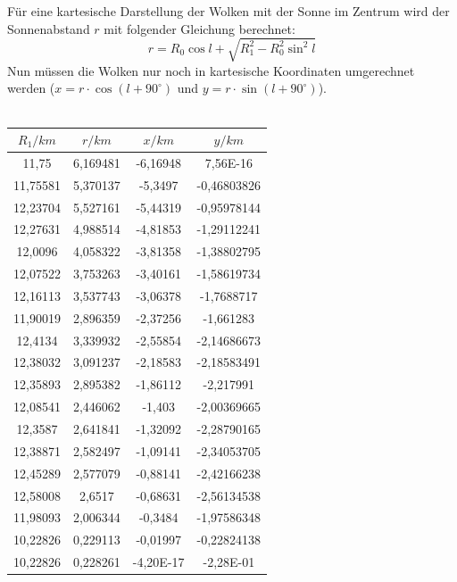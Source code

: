 \documentclass[12pt]{article}
\begin{document}
Für eine kartesische Darstellung der Wolken mit der Sonne im Zentrum wird der Sonnenabstand $r$ mit folgender Gleichung berechnet:
\[r = R_0 \cos l + \sqrt{R^2_1 - R^2_0 \sin^2 l}\]
Nun müssen die Wolken nur noch in kartesische Koordinaten umgerechnet werden ($x = r \cdot \cos (l + 90^\circ)$ und $y= r\cdot \sin ( l + 90^\circ)$).\\\\
\begin{minipage}{.5\textwidth}
        \hspace*{-0.2cm}\begin{tabular}{c|c|c|c|}
            $R_1 / km$ & $r / km$ & $x /km$ & $y / km$ \\ \hline
            11,75 & 6,169481 & -6,16948 & 7,56E-16 \\ 
            11,75581 & 5,370137 & -5,3497 & -0,46803826 \\ 
            12,23704 & 5,527161 & -5,44319 & -0,95978144 \\ 
            12,27631 & 4,988514 & -4,81853 & -1,29112241 \\ 
            12,0096 & 4,058322 & -3,81358 & -1,38802795 \\ 
            12,07522 & 3,753263 & -3,40161 & -1,58619734 \\ 
            12,16113 & 3,537743 & -3,06378 & -1,7688717 \\ 
            11,90019 & 2,896359 & -2,37256 & -1,661283 \\ 
            12,4134 & 3,339932 & -2,55854 & -2,14686673 \\ 
            12,38032 & 3,091237 & -2,18583 & -2,18583491 \\ 
            12,35893 & 2,895382 & -1,86112 & -2,217991 \\ 
            12,08541 & 2,446062 & -1,403 & -2,00369665 \\ 
            12,3587 & 2,641841 & -1,32092 & -2,28790165 \\ 
            12,38871 & 2,582497 & -1,09141 & -2,34053705 \\ 
            12,45289 & 2,577079 & -0,88141 & -2,42166238 \\ 
            12,58008 & 2,6517 & -0,68631 & -2,56134538 \\ 
            11,98093 & 2,006344 & -0,3484 & -1,97586348 \\ 
            10,22826 & 0,229113 & -0,01997 & -0,22824138 \\ 
            10,22826 & 0,228261 & -4,20E-17 & -2,28E-01 \\ 

\end{tabular}
\end{minipage}
\end{document}
